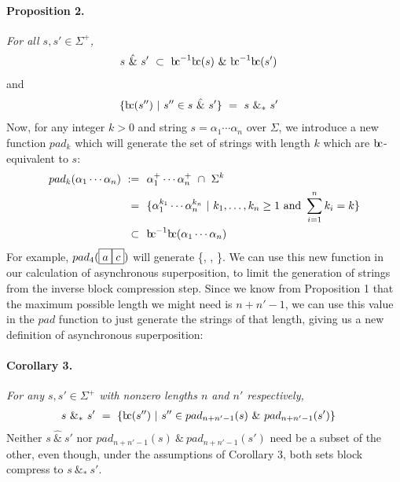 \documentclass[a4paper,11pt,leqno]{article}
\newcommand{\bc}{{\rm b\!c}}
\newcommand{\vph}[1]{\vphantom{#1}}
\newcommand{\eboxl}[1]{\fbox{$\vph{'}#1$}}
\begin{document}
\paragraph{Proposition 2.} {\sl For all $s,s'\in \Sigma^+$,}
\begin{align}
s\ \hat{\&}\ s' & \ \subset\ \bc^{-1}\bc(s)\ \&\ \bc^{-1}\bc(s')
\end{align}
and
\begin{align}
\{\bc(s'')\ | \ s''\in s\ \hat{\&}\ s'\}
& \ = \   s\ \&_*\ s'
\end{align}
Now, for any integer $k > 0$ and string $s = \alpha_1\cdots\alpha_n$ over 
$\Sigma$, we introduce a new 
function 
$pad_k$ which will generate the set of strings with length $k$ which are 
$\bc$-equivalent to $s$:
\begin{subequations}
\begin{align}
pad_k(\alpha_1\cdots\alpha_n)~:=&~~\alpha_1^+\cdots\alpha_n^+\ \cap\ \Sigma^k \\
=&~~\{
\alpha_1^{k_1}\cdots\alpha_n^{k_n}\ | \
k_1,\ldots,k_n\geq 1
\mbox{ and } \sum_{i=1}^n k_i = k \}\\
\subset&~~\bc^{-1}\bc(\alpha_1\cdots\alpha_n)
\end{align}
\end{subequations}
For example, $pad_{4}(\eboxl{a}\eboxl{c})$ will 
generate \{\eboxl{a}\eboxl{a}\eboxl{a}\eboxl{c}, 
\eboxl{a}\eboxl{a}\eboxl{c}\eboxl{c}, 
\eboxl{a}\eboxl{c}\eboxl{c}\eboxl{c}\}. We 
can use this new function in our 
calculation of asynchronous superposition, to limit the generation of strings 
from the inverse block compression step. Since we know from Proposition 1 that 
the maximum possible 
length we might need is $n+n'-1$, we can use this value in the $pad$ function 
to just 
generate the strings of that length, giving us a new definition of asynchronous 
superposition:
\paragraph{Corollary 3.} {\sl For any $s,s'\in \Sigma^+$
	with nonzero lengths $n$ and $n'$ respectively,}
\begin{align}
s \ \&_* \ s' & \ = \
\{\bc(s'')\ | \ s''\in pad_{n+n'-1}(s)\ \& \ pad_{n+n'-1}(s')\}
\end{align}
Neither $s\ \hat{\&}\ s'$ nor $pad_{n+n'-1}(s)\ \& \ pad_{n+n'-1}(s')$
need be a subset of the other, even though,
under the assumptions of Corollary 3, 
both sets block compress to $s \ \&_* \ s'$.
\end{document}
